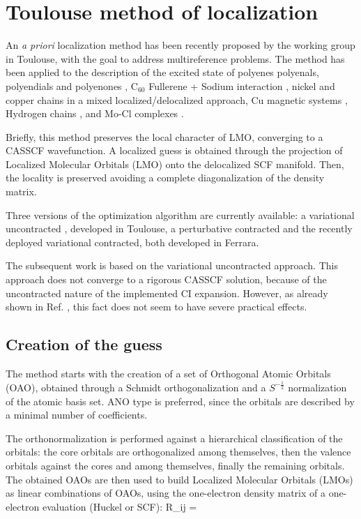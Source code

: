 \section{Toulouse method of localization}
\label{sec:toulouse_method}

An \textit{a priori} localization method has been recently proposed by the
working group in Toulouse, with the goal to address multireference problems. 
The method has been applied to the description of the excited
state of polyenes polyenals, polyendials and polyenones
\cite{ijqc-101-325-2005,ijqc-97-688-2004,cpl-372-22-2003,mp-101-1389-2003},
C$_{60}$ Fullerene + Sodium interaction \cite{jms_theo-681-203-2004}, nickel
and copper chains \cite{cpl-378-503-2003} in a mixed localized/delocalized
approach, Cu magnetic systems \cite{jpca-107-7581-2003}, Hydrogen chains
\cite{jms_theo-621-51-2003}, and Mo-Cl complexes \cite{cpl-349-555-2001}.

Briefly, this method preserves the local character of LMO, converging to a
CASSCF wavefunction. A localized guess is obtained through the projection
of Localized Molecular Orbitals (LMO) onto the delocalized SCF manifold.
Then, the locality is preserved avoiding a complete diagonalization of the
density matrix. 

Three versions of the optimization algorithm are currently available: 
a variational uncontracted \cite{jcp-116-10060-2002}, developed in Toulouse,
a perturbative contracted \cite{jcp-117-10525-2002} and the recently deployed
variational contracted, both developed in Ferrara.

The subsequent work is based on the variational uncontracted approach. This
approach does not converge to a rigorous CASSCF solution, because of the
uncontracted nature of the implemented CI expansion.  However, as already
shown in Ref. , this fact does not seem to
have severe practical effects.

\subsection*{Creation of the guess}

The method starts with the creation of a set of Orthogonal Atomic Orbitals
(OAO), obtained through a Schmidt orthogonalization and a $S^{-\frac{1}{2}}$
normalization of the atomic basis set. ANO type \cite{tca-77-291-1990} is
preferred, since the orbitals are described by a minimal number of coefficients.

The orthonormalization is performed against a hierarchical classification of
the orbitals: the core orbitals are orthogonalized among themselves, then
the valence orbitals against the cores and among themselves, finally the
remaining orbitals. The obtained OAOs are then used to build Localized
Molecular Orbitals (LMOs) as linear combinations of OAOs, using the
one-electron density matrix of a one-electron evaluation (Huckel or SCF):
\beq
R_{ij} = 
\eeq

